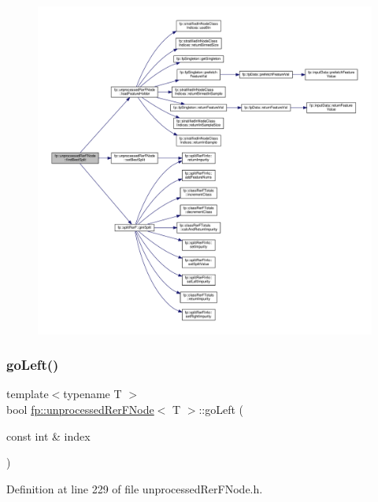 \begin{figure}[H]
\begin{center}
\leavevmode
\includegraphics[width=350pt]{classfp_1_1unprocessedRerFNode_a92456de8922f84605246d2a1800434a1_cgraph}
\end{center}
\end{figure}
\mbox{\label{classfp_1_1unprocessedRerFNode_a4c4e6bb795c327b38301610d0158735a}} 
\subsubsection{\texorpdfstring{go\+Left()}{goLeft()}}
{\footnotesize\ttfamily template$<$typename T $>$ \\
bool \hyperlink{classfp_1_1unprocessedRerFNode}{fp\+::unprocessed\+Rer\+F\+Node}$<$ T $>$\+::go\+Left (\begin{DoxyParamCaption}\item[{const int \&}]{index }\end{DoxyParamCaption})\hspace{0.3cm}{\ttfamily [inline]}}



Definition at line 229 of file unprocessed\+Rer\+F\+Node.\+h.


